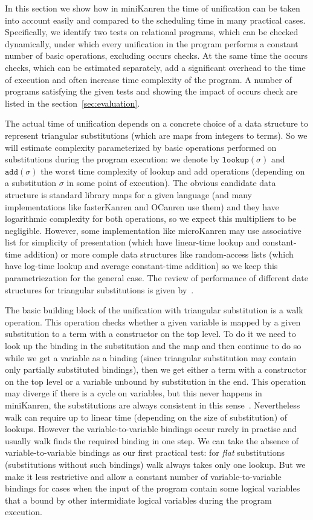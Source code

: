 \documentclass[acmsmall, anonymous, review]{acmart}
\newcommand{\sectionword}{section}
\newcommand{\mK}{miniKanren\xspace}
\newcommand{\lookuptime}[1]{\texttt{lookup}(#1)}
\newcommand{\addtime}[1]{\texttt{add}(#1)}
\begin{document}
In this section we show how in \mK the time of unification can be taken into account easily and compared to the scheduling time in many practical cases. Specifically, we identify two tests on relational programs, which can be checked dynamically, under which every unification in the program performs a constant number of basic operations, excluding occurs checks. At the same time the occurs checks, which can be estimated separately, add a significant overhead to the time of execution and often increase time complexity of the program. A number of programs satisfying the given tests and showing the impact of occurs check are listed in the \sectionword~\ref{sec:evaluation}.

The actual time of unification depends on a concrete choice of a data structure to represent triangular substitutions (which are maps from integers to terms). So we will estimate complexity parameterized by basic operations performed on substitutions during the program execution: we denote by $\lookuptime{\sigma}$ and $\addtime{\sigma}$ the worst time complexity of lookup and add operations (depending on a substitution $\sigma$ in some point of execution). The obvious candidate data structure is standard library maps for a given language (and many implementations like fasterKanren and OCanren use them) and they have logarithmic complexity for both operations, so we expect this multipliers to be negligible. However, some implementation like microKanren may use associative list for simplicity of presentation (which have linear-time lookup and constant-time addition) or more comple data structures like random-access lists (which have log-time lookup and average constant-time addition) so we keep this parametriezation for the general case. The review of performance of different date structures for triangular substitutions is given by~\citet{SubstDataStructs}.

The basic building block of the unification with triangular substitution is a walk operation. This operation checks whether a given variable is mapped by a given substitution to a term with a constructor on the top level. To do it we need to look up the binding in the substitution and the map and then continue to do so while we get a variable as a binding (since triangular substitution may contain only partially substituted bindings), then we get either a term with a constructor on the top level or a variable unbound by substitution in the end. This operation may diverge if there is a cycle on variables, but this never happens in miniKanren, the substitutions are always consistent in this sense~\cite{NominalUnificationWithTriangularSubstitutions}. Nevertheless walk can require up to linear time (depending on the size of substitution) of lookups. However the variable-to-variable bindings occur rarely in practise and usually walk finds the required binding in one step. We can take the absence of variable-to-variable bindings as our first practical test: for \emph{flat} substitutions (substitutions without such bindings) walk always takes only one lookup. But we make it less restrictive and allow a constant number of variable-to-variable bindings for cases when the input of the program contain some logical variables that a bound by other intermidiate logical variables during the program execution.
\end{document}
